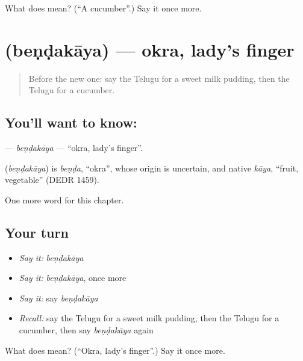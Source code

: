 \begin{tcolorbox}[breakable,colback=teal!4,colframe=teal!35!black,title={Before you move on}]
What does  mean? (\textquotedblleft{}A cucumber\textquotedblright{}.) Say it once more.
\end{tcolorbox}
\section[\texorpdfstring{\te{బెండకాయ} (beṇḍakāya)}{బెండకాయ (beṇḍakāya)}]{ (beṇḍakāya) — okra, lady's finger}

\label{lesson:TE-C184-bendakaya}



\begin{quote}
Before the new one: say the Telugu for a sweet milk pudding, then the Telugu for a cucumber.
\end{quote}

\subsection*{You'll want to know: }
\textbf{} — \emph{beṇḍakāya} — \textquotedblleft{}okra, lady's finger\textquotedblright{}.

\begin{cousinweb}
\textbf{} (\emph{beṇḍakāya}) is \emph{beṇḍa}, \textquotedblleft{}okra\textquotedblright{}, whose origin is uncertain, and native \emph{kāya}, \textquotedblleft{}fruit, vegetable\textquotedblright{} (DEDR 1459).
\end{cousinweb}

\begin{grammarlens}[title={What you've built}]
One more word for this chapter.
\end{grammarlens}

\subsection*{Your turn}
\begin{itemize}
\raggedright
  \item \emph{Say it:} \emph{beṇḍakāya}
  \item \emph{Say it:} \emph{beṇḍakāya}, once more
  \item \emph{Say it:} say \emph{beṇḍakāya}
  \item \emph{Recall:} say the Telugu for a sweet milk pudding, then the Telugu for a cucumber, then say \emph{beṇḍakāya} again
\end{itemize}

\begin{tcolorbox}[breakable,colback=teal!4,colframe=teal!35!black,title={Before you move on}]
What does  mean? (\textquotedblleft{}Okra, lady's finger\textquotedblright{}.) Say it once more.
\end{tcolorbox}
